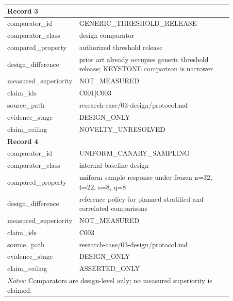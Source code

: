 \begin{longtable}{|p{0.24\linewidth}|p{0.68\linewidth}|}
\multicolumn{2}{|l|}{\textbf{Record 3}} \\ \hline
comparator\_\allowbreak{}id & GENERIC\_\allowbreak{}THRESHOLD\_\allowbreak{}RELEASE \\ \hline
comparator\_\allowbreak{}class & design comparator \\ \hline
compared\_\allowbreak{}property & authorized threshold release \\ \hline
design\_\allowbreak{}difference & prior art already occupies generic threshold release;\allowbreak{} KEYSTONE comparison is narrower \\ \hline
measured\_\allowbreak{}superiority & NOT\_\allowbreak{}MEASURED \\ \hline
claim\_\allowbreak{}ids & C001|C003 \\ \hline
source\_\allowbreak{}path & research-case/03-design/protocol.md \\ \hline
evidence\_\allowbreak{}stage & DESIGN\_\allowbreak{}ONLY \\ \hline
claim\_\allowbreak{}ceiling & NOVELTY\_\allowbreak{}UNRESOLVED \\ \hline
\multicolumn{2}{|l|}{\textbf{Record 4}} \\ \hline
comparator\_\allowbreak{}id & UNIFORM\_\allowbreak{}CANARY\_\allowbreak{}SAMPLING \\ \hline
comparator\_\allowbreak{}class & internal baseline design \\ \hline
compared\_\allowbreak{}property & uniform sample response under frozen n=32, t=22, s=8, q=8 \\ \hline
design\_\allowbreak{}difference & reference policy for planned stratified and correlated comparisons \\ \hline
measured\_\allowbreak{}superiority & NOT\_\allowbreak{}MEASURED \\ \hline
claim\_\allowbreak{}ids & C003 \\ \hline
source\_\allowbreak{}path & research-case/03-design/protocol.md \\ \hline
evidence\_\allowbreak{}stage & DESIGN\_\allowbreak{}ONLY \\ \hline
claim\_\allowbreak{}ceiling & ASSERTED\_\allowbreak{}ONLY \\ \hline
\multicolumn{2}{|p{0.92\linewidth}|}{\textit{Notes:} Comparators are design-level only; no measured superiority is claimed.} \\ \hline
\end{longtable}
\endgroup

